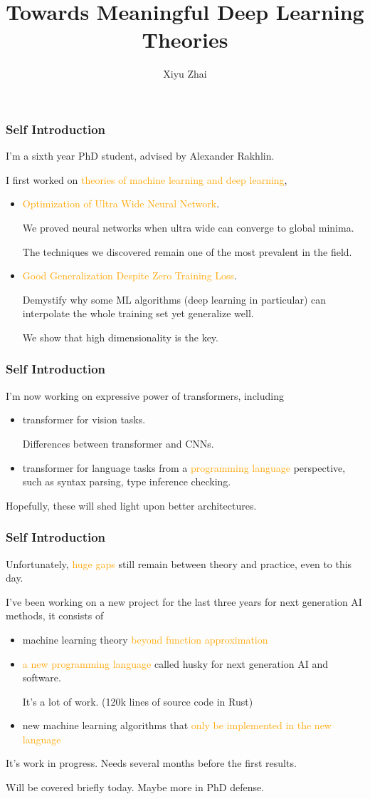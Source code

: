 \documentclass{beamer}   	%
\title{Towards Meaningful Deep Learning Theories}
\author{Xiyu Zhai}
\date{}							%
\theoremstyle{definition}
\newcommand{\highlight}[1]{\textcolor{orange}{#1}}
\begin{document}
\maketitle

\begin{frame}
\frametitle{Self Introduction}
I'm a sixth year PhD student, advised by Alexander Rakhlin.

I first worked on \highlight{theories of machine learning and deep learning},
\begin{itemize}
	\item \highlight{Optimization of Ultra Wide Neural Network}.

	We proved neural networks when ultra wide can converge to global minima.

	The techniques we discovered remain one of the most prevalent in the field.
	\item \highlight{Good Generalization Despite Zero Training Loss}.

	Demystify why some ML algorithms (deep learning in particular) can interpolate the whole training set yet generalize well.

	We show that high dimensionality is the key.
\end{itemize}
\end{frame}
\begin{frame}
	
\frametitle{Self Introduction}
I'm now working on expressive power of transformers, including
\begin{itemize}
	\item transformer for vision tasks.

	Differences between transformer and CNNs.
	\item transformer for language tasks from a \highlight{programming language} perspective, such as syntax parsing, type inference checking.
\end{itemize}

Hopefully, these will shed light upon better architectures.
\end{frame}
\begin{frame}
\frametitle{Self Introduction}
Unfortunately, \highlight{huge gaps} still remain between theory and practice, even to this day.

I've been working on a new project for the last three years for next generation AI methods, it consists of 
\begin{itemize}
	\item machine learning theory \highlight{beyond function approximation}
	\item \highlight{a new programming language} called husky for next generation AI and software.

	It's a lot of work. (120k lines of source code in Rust)
	\item new machine learning algorithms that \highlight{only be implemented in the new language}
\end{itemize}

It's work in progress. Needs several months before the first results.

Will be covered briefly today. Maybe more in PhD defense.
\end{frame}
\end{document}
